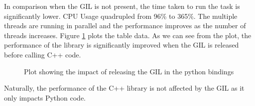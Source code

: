 \begin{spacing}{1.2}
    In comparison when the GIL is not present, the time taken to run the task is significantly lower. CPU Usage quadrupled
    from 96\% to 365\%. The multiple threads are running in parallel and the performance improves as the number of threads
    increases. Figure \ref{fig:gil_impact} plots the table data. As we can see from the plot, the performance of the library
    is significantly improved when the GIL is released before calling C++ code.\\
    \begin{figure}
        \centering
        \qquad
        \caption{Plot showing the impact of releasing the GIL in the python bindings}%
        \label{fig:gil_impact}%


    \end{figure}

    Naturally, the performance of the C++ library is not affected by the GIL as it only impacts Python code.


\end{spacing}
